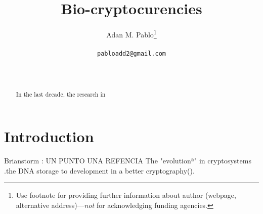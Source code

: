 \documentclass{article}
\title{Bio-cryptocurencies
}
\author{
  Adan M. Pablo\thanks{Use footnote for providing further
    information about author (webpage, alternative
    address)---\emph{not} for acknowledging funding agencies.} \\
 \\\texttt{pabloadd2@gmail.com} \\
   \And
\\
\\
}
\begin{document}
\maketitle


\begin{abstract}
In the last decade, the research in

\end{abstract}




\section{Introduction}
Brianstorm : UN PUNTO UNA REFENCIA
The "evolutionª" in cryptosystems 
.the DNA storage to development in a better cryptography().
\end{document}
